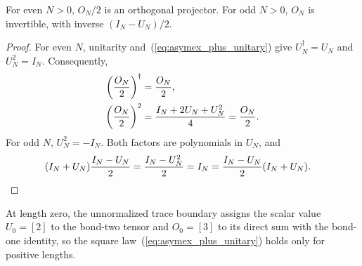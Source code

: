 \begin{lemma}
    \label{lem:asymex_plus_parity}
    \leanok
    For even $N>0$, $O_N/2$ is an orthogonal projector. For odd $N>0$,
    $O_N$ is invertible, with inverse $(I_N-U_N)/2$.
\end{lemma}

\begin{proof}
    \leanok
    For even $N$, unitarity and~(\ref{eq:asymex_plus_unitary}) give
    $U_N^\dagger=U_N$ and $U_N^2=I_N$. Consequently,
    \begin{align}
        \left(\frac{O_N}{2}\right)^\dagger & =\frac{O_N}{2},
        \notag                                                                        \\
        \left(\frac{O_N}{2}\right)^2
                                           & =\frac{I_N+2U_N+U_N^2}{4}=\frac{O_N}{2}.
        \notag
    \end{align}
    For odd $N$, $U_N^2=-I_N$. Both factors are polynomials in $U_N$, and
    \begin{align}
        (I_N+U_N)\frac{I_N-U_N}{2}
         & =\frac{I_N-U_N^2}{2}
        =I_N
        =\frac{I_N-U_N}{2}(I_N+U_N).
        \notag
    \end{align}
\end{proof}

At length zero, the unnormalized trace boundary assigns the scalar value
$U_0=[2]$ to the bond-two tensor and $O_0=[3]$ to its direct sum with the
bond-one identity, so the square law~(\ref{eq:asymex_plus_unitary}) holds only
for positive lengths.

